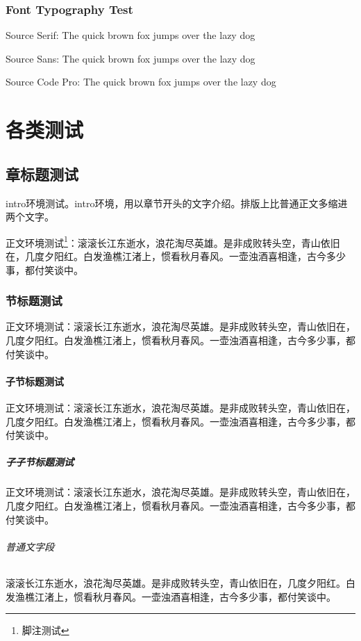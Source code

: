 \documentclass{../../PublicResources/DocClass}
\begin{document}
    \section{Font Typography Test}
    {Source Serif: The quick brown fox jumps over the lazy dog}

    {\sffamily Source Sans: The quick brown fox jumps over the lazy dog}

    {\ttfamily Source Code Pro: The quick brown fox jumps over the lazy dog}

    \part{各类测试}
    \chapter{章标题测试}

    \begin{intro}
        intro环境测试。intro环境，用以章节开头的文字介绍。排版上比普通正文多缩进两个文字。
    \end{intro}

    正文环境测试\footnote{脚注测试}：滚滚长江东逝水，浪花淘尽英雄。是非成败转头空，青山依旧在，几度夕阳红。白发渔樵江渚上，惯看秋月春风。一壶浊酒喜相逢，古今多少事，都付笑谈中。

    \section{节标题测试}
    正文环境测试：滚滚长江东逝水，浪花淘尽英雄。是非成败转头空，青山依旧在，几度夕阳红。白发渔樵江渚上，惯看秋月春风。一壶浊酒喜相逢，古今多少事，都付笑谈中。

    \subsection{子节标题测试}
    正文环境测试：滚滚长江东逝水，浪花淘尽英雄。是非成败转头空，青山依旧在，几度夕阳红。白发渔樵江渚上，惯看秋月春风。一壶浊酒喜相逢，古今多少事，都付笑谈中。

    \subsubsection{子子节标题测试}
    正文环境测试：滚滚长江东逝水，浪花淘尽英雄。是非成败转头空，青山依旧在，几度夕阳红。白发渔樵江渚上，惯看秋月春风。一壶浊酒喜相逢，古今多少事，都付笑谈中。

    \paragraph{普通文字段} 滚滚长江东逝水，浪花淘尽英雄。是非成败转头空，青山依旧在，几度夕阳红。白发渔樵江渚上，惯看秋月春风。一壶浊酒喜相逢，古今多少事，都付笑谈中。
\end{document}
